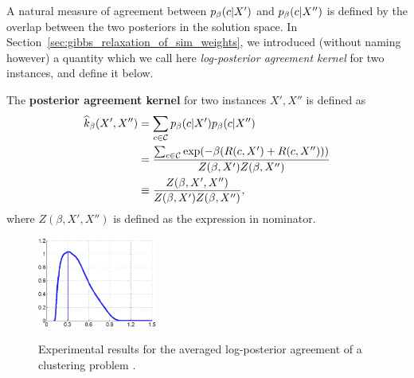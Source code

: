A natural measure of agreement between $p_\beta(c|X')$ and
$p_\beta(c|X'')$ is defined by the overlap between the two posteriors in the
solution space. In Section~\ref{sec:gibbs_relaxation_of_sim_weights}, we
introduced (without naming however) a quantity which we call here
\textit{log-posterior agreement kernel} for two instances, and define it below.
\begin{definition}\label{def:free_posterior_agreement_kernel}
  The \textbf{posterior agreement kernel} for two instances $X', X''$
  is defined as 
\begin{align}\label{eq:simker}
  \widehat{k}_\beta(X', X'') &= \sum_{c \in {\cal C}} p_\beta(c | X') p_\beta(c
  | X'') \notag \\ 
    &= \frac{
    \sum_{c\in {\cal C}} \exp(-\beta (R(c,X') + R(c,X''))) 
  }{
    Z(\beta,X') Z(\beta,X'')
  } \notag \\
  &\equiv \frac{
    Z(\beta, X', X'')
  }{
    Z(\beta, X') Z(\beta, X'')
  },
\end{align}
where $Z(\beta, X', X'')$ is defined as the expression in nominator.
%
\end{definition}

\begin{figure}[ht!]
  \centering\noindent\includegraphics[width=0.35\textwidth]{figures/ch_free_energy/experimental_mututal_inf_chehreghani2012}%
\\[.5cm]
\caption{Experimental results for the averaged log-posterior agreement
  of a clustering problem 
  \citep{morteza12}.}
\label{fig:experiments-capacity}
\end{figure}%


